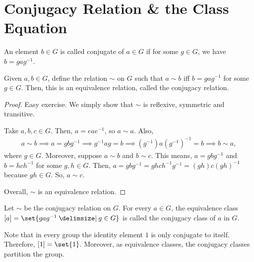 \documentclass[11pt]{penrose}
\begin{document}
\section{Conjugacy Relation \& the Class Equation}
\begin{ndfn}
    An element $b \in G$ is called conjugate of $a \in G$ if for some $g \in G$, we have $b = g a g^{-1}$.
\end{ndfn}

\begin{nthm}
    Given $a,b \in G$, define the relation $\sim$ on $G$ such that $a \sim b$ iff $b = g a g^{-1}$ for some $g \in G$. Then, this is an equivalence relation, called the conjugacy relation.
\end{nthm}
\begin{proof}
    Easy exercise. We simply show that $\sim$ is reflexive, symmetric and transitive.

    Take $a, b, c \in G$. Then, $a = e a e^{-1}$, so $a \sim a$. Also,
    \begin{align*}
        a \sim b
        \implies
        a = g b g^{-1}
        \implies
        g^{-1} a g = b
        \implies
        (g^{-1}) a (g^{-1})^{-1} = b
        \implies
        b \sim a,
    \end{align*}
    where $g \in G$. Moreover, suppose $a \sim b$ and $b \sim c$. This means, $a = g b g^{-1}$ and $b = h c h^{-1}$ for some $g, h \in G$. Then, $a = g b g^{-1} = g h c h^{-1} g^{-1} = (gh) c (gh)^{-1}$ because $gh \in G$. So, $a \sim c$.

    Overall, $\sim$ is an equivalence relation.
\end{proof}

\begin{ndfn}
    Let $\sim$ be the conjugacy relation on $G$. For every $a \in G$, the equivalence class $[a] = \set{ g a g^{-1} \st g \in G }$ is called the conjugacy class of $a$ in $G$.
\end{ndfn}

Note that in every group the identity element $1$ is only conjugate to itself. Therefore, $[1] = \set{1}$. Moreover, as equivalence classes, the conjugacy classes partition the group.
\end{document}
